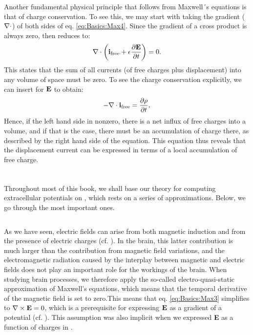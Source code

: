 Another fundamental physical principle that follows from Maxwell´s equations is that of charge conservation. To see this, we may start with taking the gradient (${\bf \nabla} \cdot$) of both sides of eq. \ref{eq:Basics:Max4}. Since the gradient of a cross product is always zero,  then reduces to:
\begin{equation}
{\bf \nabla} \cdot \left( {\bf i}_\text{free} +  \epsilon \frac{\partial {\bf E}}{\partial t} \right) = 0.
\label{eq:Basics:Max4dot}
\end{equation}
This states that the sum of all currents (of free charges plus displacement) into any volume of space must be zero. To see the charge conservation explicitly, we can insert  for ${\bf E}$ to obtain:
\begin{equation}
- {\bf \nabla} \cdot {\bf i}_\text{free} =  \frac{\partial \rho}{\partial t},
\label{eq:Basics:currentconservation}
\end{equation}
Hence, if the left hand side in nonzero, there is a net influx of free charges into a volume, and if that is the case, there must be an accumulation of charge there, as described by the right hand side of the equation. This equation thus reveals that the displacement current can be expressed in terms of a local accumulation of free charge.


\section{}
Throughout most of this book, we shall base our theory for computing extracellular potentials on , which rests on a series of approximations. Below, we go through the most important ones. 


\subsection{}
\label{sec:Basics:Quasielectrostatic} 
As we have seen, electric fields can arise from both magnetic induction and from the presence of electric charges (cf. ). In the brain, this latter contribution is much larger than the contribution from magnetic field variations, and the electromagnetic radiation caused by the interplay between magnetic and electric fields does not play an important role for the workings of the brain. When studying brain processes, we therefore apply the so-called electro-quasi-static approximation of Maxwell's equations, which means that the temporal derivative of the magnetic field is set to zero.This means that eq. \ref{eq:Basics:Max3} simplifies to ${\bf \nabla} \times {\bf E} = 0$, which is a prerequisite for expressing ${\bf E}$ as a gradient of a potential (cf. ). This assumption was also implicit when we expressed {\bf E} as a function of charges in .


